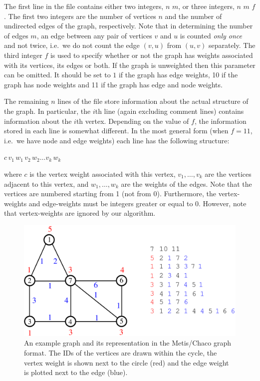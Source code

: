 \documentclass[11pt]{article}
\newcommand{\ie}{i.e.\ }
\begin{document}
The first line in the file contains either two integers, $n$ $m$, or three integers, $n$ $m$ $f$. The first two integers are the number of vertices $n$ and the number of undirected edges of the graph, respectively. Note that in determining the number of edges $m$, an edge between any pair of vertices $v$ and $u$ is counted \emph{only once} and not twice, \ie we do not count the edge $(v,u)$ from $(u,v)$ separately. The third integer $f$ is used to specify whether or not the graph has weights associated with its vertices, its edges or both. If the graph is unweighted then this parameter can be omitted. It should be set to $1$ if the graph has edge weights, 10 if the graph has node weights and 11 if the graph has edge and node weights.

The remaining $n$ lines of the file store information about the actual structure of the graph. In particular, the $i$th line (again excluding comment lines) contains information about the $i$th vertex. Depending on the value of $f$, the information stored in each line is somewhat different. In the most general form (when $f=11$, \ie we have node and edge weights) each line has the following structure:
\begin{center}
       $c\, v_1\, w_1\, v_2\, w_2 \ldots v_k\, w_k$ 
\end{center}
where $c$ is the vertex weight associated with this vertex, $v_1, \ldots, v_k$ are the vertices adjacent to this vertex, and $w_1, \ldots, w_k$ are the weights of the edges. Note that the vertices are numbered starting from 1 (not from 0). Furthermore, the vertex-weights and edge-weights must be integers greater or equal to 0. However, note that vertex-weights are ignored by our algorithm. 
\begin{figure}[h!]
\begin{center}
\includegraphics[width=.6\textwidth]{example_graph.pdf}
\end{center}

\caption{An example graph and its representation in the Metis/Chaco graph format. The IDs of the vertices are drawn within the cycle, the vertex weight is shown next to the circle ({\color{red}red}) and the edge weight is plotted next to the edge ({\color{blue}blue}).}
\label{fig:example}
\end{figure}
\end{document}
